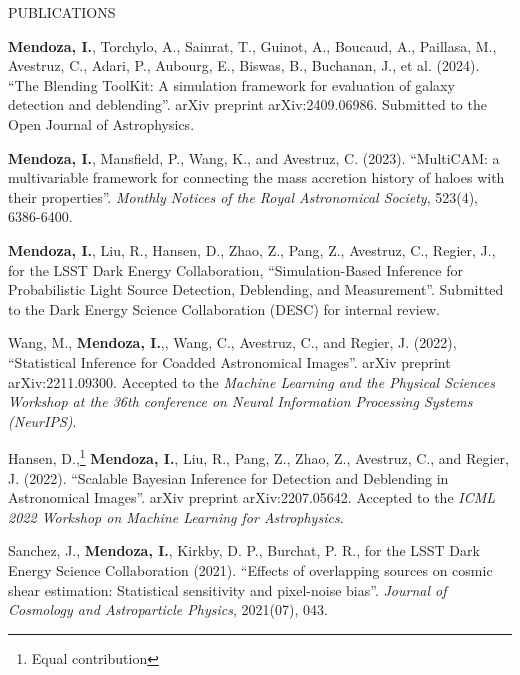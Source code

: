 \documentclass{resume} %
\begin{document}
\begin{rSection}{PUBLICATIONS}
%
\vspace*{-1em}

\item \textbf{Mendoza, I.}, Torchylo, A., Sainrat, T., Guinot, A., Boucaud, A., Paillasa, M., Avestruz, C., Adari, P., Aubourg, E., Biswas, B., Buchanan, J., et al. (2024). ``The Blending ToolKit: A simulation framework for evaluation of galaxy detection and deblending''. arXiv preprint arXiv:2409.06986. Submitted to the Open Journal of Astrophysics.

\item \textbf{Mendoza, I.}, Mansfield, P., Wang, K., and Avestruz, C. (2023). ``MultiCAM: a multivariable framework for connecting the mass accretion history of haloes with their properties''. \textit{Monthly Notices of the Royal Astronomical Society}, 523(4), 6386-6400.

\item \textbf{Mendoza, I.}, Liu, R., Hansen, D., Zhao, Z., Pang, Z., Avestruz, C., Regier, J., for the LSST Dark Energy Collaboration, ``Simulation-Based Inference for Probabilistic Light Source Detection, Deblending, and Measurement''. Submitted to the Dark Energy Science Collaboration (DESC) for internal review.

\item Wang, M., \textbf{Mendoza, I.},, Wang, C., Avestruz, C., and Regier, J. (2022), ``Statistical Inference for Coadded Astronomical Images''. arXiv preprint arXiv:2211.09300. Accepted to the \textit{Machine Learning and the Physical Sciences Workshop at the 36th conference on Neural Information Processing Systems (NeurIPS)}.

\item Hansen, D.,\footnote[1]{\label{ft:equal} Equal contribution} \textbf{Mendoza, I.}, Liu, R., Pang, Z., Zhao, Z., Avestruz, C., and Regier, J. (2022). ``Scalable Bayesian Inference for Detection and Deblending in Astronomical Images''. arXiv preprint arXiv:2207.05642. Accepted to the \textit{ICML 2022 Workshop on Machine Learning for Astrophysics}.

\item Sanchez, J., \textbf{Mendoza, I.}, Kirkby, D. P., Burchat, P. R., for the LSST Dark Energy Science Collaboration (2021). “Effects of overlapping sources on cosmic shear estimation: Statistical sensitivity and pixel-noise bias”. \textit{Journal of Cosmology and Astroparticle Physics}, 2021(07), 043.

\end{rSection}
\end{document}
